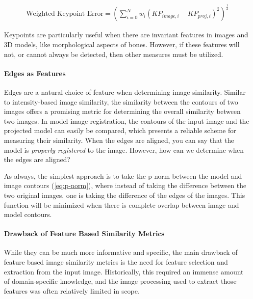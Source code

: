 \begin{equation}
    \begin{aligned}
        \text{Weighted Keypoint Error} = (\sum_{i = 0}^{N}w_{i}(KP_{image,i} - KP_{proj,i})^2)^{\frac{1}{2}}
    \end{aligned}
    \label{eq:wkp-error}
\end{equation}

Keypoints are particularly useful when there are invariant features in images and 3D models, like morphological aspects of bones. However, if these features will not, or cannot always be detected, then other measures must be utilized.

\paragraph*{Edges as Features}
Edges are a natural choice of feature when determining image similarity. Similar to intensity-based image similarity, the similarity between the contours of two images offers a promising metric for determining the overall similarity between two images. In model-image registration, the contours of the input image and the projected model can easily be compared, which presents a reliable scheme for measuring their similarity. When the edges are aligned, you can say that the model is \textit{properly registered} to the image. However, how can we determine when the edges are aligned?

As always, the simplest approach is to take the p-norm between the model and image contours (\cref{eq:p-norm}), where instead of taking the difference between the two original images, one is taking the difference of the edges of the images. This function will be minimized when there is complete overlap between image and model contours.

\paragraph{Drawback of Feature Based Similarity Metrics}
While they can be much more informative and specific, the main drawback of feature based image similarity metrics is the need for feature selection and extraction from the input image. Historically, this required an immense amount of domain-specific knowledge, and the image processing used to extract those features was often relatively limited in scope.


